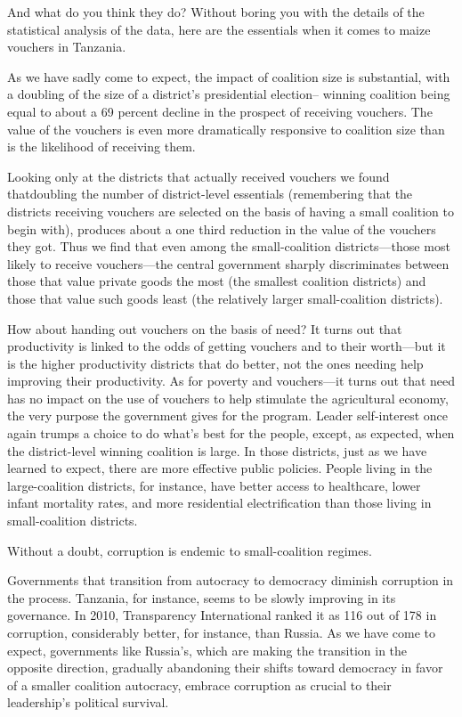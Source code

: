 \documentclass[10pt]{article}
\begin{document}
{\large And what do you think they do? Without boring you with the details of
the statistical analysis of the data, here are the essentials when it comes to
maize vouchers in Tanzania.}

{\large As we have sadly come to expect, the impact of coalition size is
substantial, with a doubling of the size of a district's presidential election--
winning coalition being equal to about a 69 percent decline in the prospect of
receiving vouchers. The value of the vouchers is even more dramatically
responsive to coalition size than is the likelihood of receiving them.}

{\large Looking only at the districts that actually received vouchers we found
thatdoubling the number of district-level essentials (remembering that the
districts receiving vouchers are selected on the basis of having a small
coalition to begin with), produces about a one third reduction in the value of
the vouchers they got. Thus we find that even among the small-coalition
districts---those most likely to receive vouchers---the central government
sharply discriminates between those that value private goods the most (the
smallest coalition districts) and those that value such goods least (the
relatively larger small-coalition districts).}

{\large How about handing out vouchers on the basis of need? It turns out that
productivity is linked to the odds of getting vouchers and to their worth---but
it is the higher productivity districts that do better, not the ones needing help
improving their productivity. As for poverty and vouchers---it turns out that
need has no impact on the use of vouchers to help stimulate the agricultural
economy, the very purpose the government gives for the program. Leader
self-interest once again trumps a choice to do what's best for the people,
except, as expected, when the district-level winning coalition is large. In those
districts, just as we have learned to expect, there are more effective public
policies. People living in the large-coalition districts, for instance, have
better access to healthcare, lower infant mortality rates, and more residential
electrification than those living in small-coalition districts.}

{\large Without a doubt, corruption is endemic to small-coalition regimes.}

{\large Governments that transition from autocracy to democracy diminish
corruption in the process. Tanzania, for instance, seems to be slowly improving
in its governance. In 2010, Transparency International ranked it as 116 out of
178 in corruption, considerably better, for instance, than Russia. As we have
come to expect, governments like Russia's, which are making the transition in the
opposite direction, gradually abandoning their shifts toward democracy in favor
of a smaller coalition autocracy, embrace corruption as crucial to their
leadership's political survival.}
\end{document}
